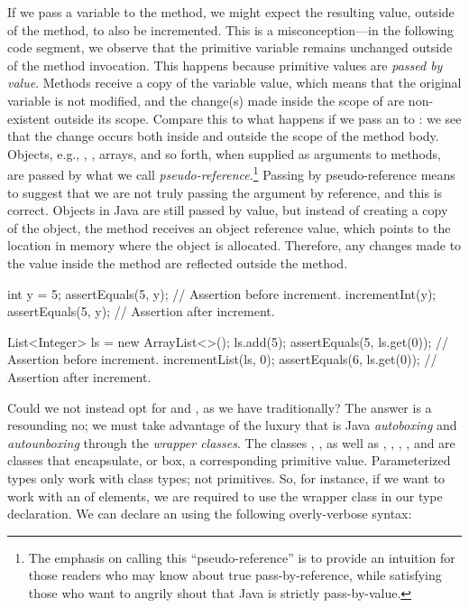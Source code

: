 If we pass a variable to the  method, we might expect the resulting value, outside of the method, to also be incremented. 
This is a misconception---in the following code segment, we observe that the primitive variable  remains unchanged outside of the method invocation. 
This happens because primitive values are \emph{passed by value}. 
Methods receive a copy of the variable value, which means that the original variable is not modified, and the change(s) made inside the scope of  are non-existent outside its scope. 
Compare this to what happens if we pass an  to : we see that the change occurs both inside and outside the scope of the method body. 
Objects, e.g., , , arrays, and so forth, when supplied as arguments to methods, are passed by what we call \emph{pseudo-reference}.\footnote{The emphasis on calling this ``pseudo-reference'' is to provide an intuition for those readers who may know about true pass-by-reference, while satisfying those who want to angrily shout that Java is strictly pass-by-value.} 
Passing by pseudo-reference means to suggest that we are not truly passing the argument by reference, and this is correct. 
Objects in Java are still passed by value, but instead of creating a copy of the object, the method receives an object reference value, which points to the location in memory where the object is allocated. 
Therefore, any changes made to the value inside the method are reflected outside the method.

\begin{verbnobox}[\small]
int y = 5;
assertEquals(5, y);         // Assertion before increment.
incrementInt(y);
assertEquals(5, y);         // Assertion after increment.
\end{verbnobox}

\begin{verbnobox}[\small]
List<Integer> ls = new ArrayList<>();
ls.add(5);
assertEquals(5, ls.get(0)); // Assertion before increment.
incrementList(ls, 0);
assertEquals(6, ls.get(0)); // Assertion after increment.
\end{verbnobox}

Could we not instead opt for  and , as we have traditionally? 
The answer is a resounding no; we must take advantage of the luxury that is Java \emph{autoboxing} and \emph{autounboxing} through the \emph{wrapper classes}. 
The classes , , as well as , , , , and  are classes that encapsulate, or box, a corresponding primitive value. 
Parameterized types only work with class types; not primitives. 
So, for instance, if we want to work with an  of  elements, we are required to use the  wrapper class in our type declaration. 
We can declare an  using the following overly-verbose syntax:

